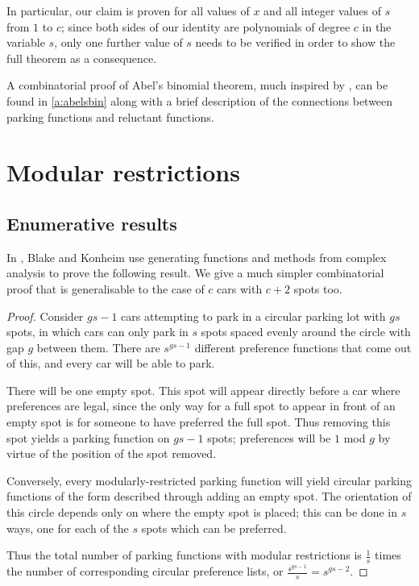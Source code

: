 \documentclass[12 pt]{amsart}
\theoremstyle{definition} %
\theoremstyle{remark} %
\begin{document}
In particular, our claim is proven for all values of $x$ and all integer values of $s$ from $1$ to $c$; since both sides of our identity are polynomials of degree $c$ in the variable $s$, only one further value of $s$ needs to be verified in order to show the full theorem as a consequence.

A combinatorial proof of Abel's binomial theorem, much inspired by \cite{shapiro-1991}, can be found in \cref{a:abelsbin} along with a brief description of the connections between parking functions and reluctant functions.

\section{Modular restrictions} \label{s:mod-res}

\subsection{Enumerative results}

In \cite{blake-konheim-1977}, Blake and Konheim use generating functions and methods from complex analysis to prove the following result. We give a much simpler combinatorial proof that is generalisable to the case of $c$ cars with $c + 2$ spots too.

\modPFcount*

\begin{proof}
    Consider $gs-1$ cars attempting to park in a circular parking lot with $gs$ spots, in which cars can only park in $s$ spots spaced evenly around the circle with gap $g$ between them. There are $s^{gs-1}$ different preference functions that come out of this, and every car will be able to park.

    There will be one empty spot. This spot will appear directly before a car where preferences are legal, since the only way for a full spot to appear in front of an empty spot is for someone to have preferred the full spot. Thus removing this spot yields a parking function on $gs-1$ spots; preferences will be $1$ mod $g$ by virtue of the position of the spot removed.
    
    Conversely, every modularly-restricted parking function will yield circular parking functions of the form described through adding an empty spot. The orientation of this circle depends only on where the empty spot is placed; this can be done in $s$ ways, one for each of the $s$ spots which can be preferred.

    Thus the total number of parking functions with modular restrictions is $\frac{1}{s}$ times the number of corresponding circular preference lists, or $\frac{s^{gs-1}}{s}=s^{gs-2}$.
\end{proof}
\end{document}
